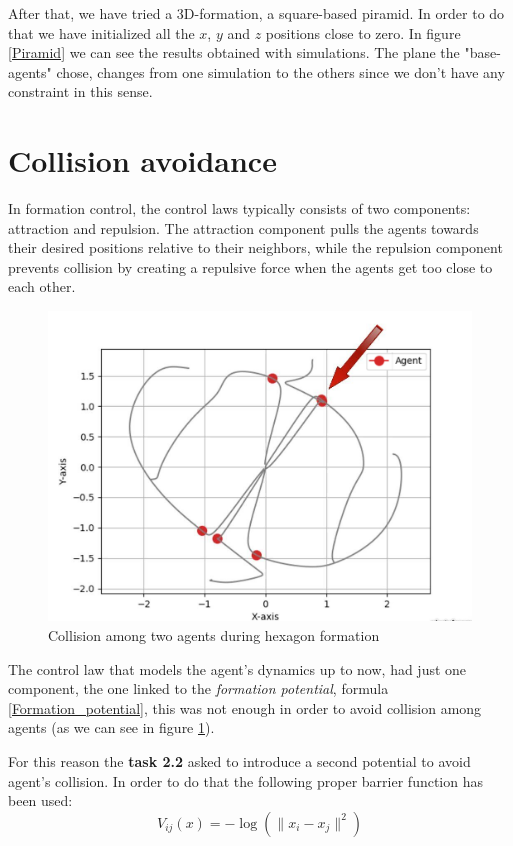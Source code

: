 \documentclass[a4paper,11pt,oneside]{book}
\begin{document}
After that, we have tried a 3D-formation, a square-based piramid. In order to do that we have initialized all the $x$, $y$ and $z$ positions close to zero. In figure \ref{Piramid} we can see the results obtained with simulations. The plane the "base-agents" chose, changes from one simulation to the others since we don't have any constraint in this sense.


\section{Collision avoidance}
In formation control, the control laws typically consists of two components: attraction and repulsion. The attraction component pulls the agents towards their desired positions relative to their neighbors, while the repulsion component prevents collision by creating a repulsive force when the agents get too close to each other.

\begin{figure}[h]
\centering
	\includegraphics[scale=0.25]{Collision.jpg}
	\caption{Collision among two agents during hexagon formation}
	\label{Collision}
\end{figure}

The control law that models the agent's dynamics up to now, had just one component, the one linked to the \textit{formation potential}, formula \ref{Formation_potential}, this was not enough in order to avoid collision among agents (as we can see in figure \ref{Collision}). 

\bigskip
For this reason the \textbf{task 2.2} asked to introduce a second potential to avoid agent's collision. In order to do that the following proper barrier function has been used:
\begin{equation}
V_{ij}(x) = - \log( \lVert x_i - x_j \rVert ^2)
\label{Collision_barrier}
\end{equation}
\end{document}
